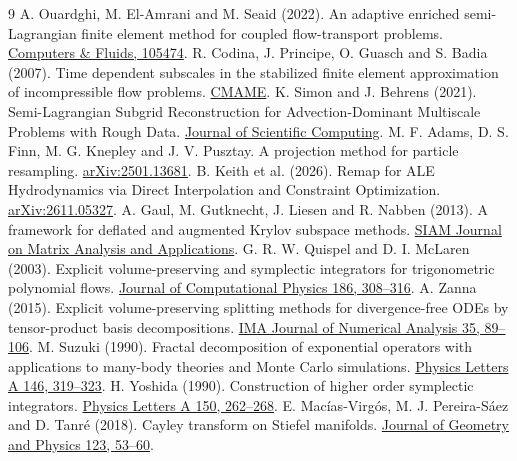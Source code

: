 \documentclass[10pt,a4paper]{article}
\begin{document}
\begin{thebibliography}{9}
 A. Ouardghi, M. El-Amrani and M. Seaid (2022).
An adaptive enriched semi-Lagrangian finite element method for coupled flow-transport problems.
\href{https://doi.org/10.1016/j.compfluid.2022.105474}{Computers \& Fluids, 105474}.
 R. Codina, J. Principe, O. Guasch and S. Badia (2007).
Time dependent subscales in the stabilized finite element approximation of incompressible
flow problems. \href{https://doi.org/10.1016/j.cma.2007.01.002}{CMAME}.
 K. Simon and J. Behrens (2021).
Semi-Lagrangian Subgrid Reconstruction for Advection-Dominant Multiscale Problems with Rough Data.
\href{https://doi.org/10.1007/s10915-021-01451-w}{Journal of Scientific Computing}.
 M. F. Adams, D. S. Finn, M. G. Knepley and J. V. Pusztay.
A projection method for particle resampling.
\href{https://arxiv.org/abs/2501.13681}{arXiv:2501.13681}.
 B. Keith et al. (2026).
Remap for ALE Hydrodynamics via Direct Interpolation and Constraint Optimization.
\href{https://arxiv.org/abs/2611.05327}{arXiv:2611.05327}.
 A. Gaul, M. Gutknecht, J. Liesen and R. Nabben (2013).
A framework for deflated and augmented Krylov subspace methods.
\href{https://people.math.ethz.ch/~mhg/pub/defl-GGLN1-SIMAX.pdf}{SIAM Journal on Matrix Analysis and Applications}.
 G. R. W. Quispel and D. I. McLaren (2003).
Explicit volume-preserving and symplectic integrators for trigonometric
polynomial flows. \href{https://www.sciencedirect.com/science/article/abs/pii/S0021999103000688}{Journal of Computational Physics 186, 308--316}.
 A. Zanna (2015). Explicit volume-preserving splitting
methods for divergence-free ODEs by tensor-product basis decompositions.
\href{https://doi.org/10.1093/imanum/drt070}{IMA Journal of Numerical Analysis 35, 89--106}.
 M. Suzuki (1990). Fractal decomposition of exponential
operators with applications to many-body theories and Monte Carlo simulations.
\href{https://doi.org/10.1016/0375-9601(90)90962-N}{Physics Letters A 146, 319--323}.
 H. Yoshida (1990). Construction of higher order symplectic
integrators. \href{https://doi.org/10.1016/0375-9601(90)90092-3}{Physics Letters A 150, 262--268}.
 E. Mac\'ias-Virg\'os, M. J. Pereira-S\'aez and D. Tanr\'e (2018).
Cayley transform on Stiefel manifolds.
\href{https://doi.org/10.1016/j.geomphys.2017.08.011}{Journal of Geometry and Physics 123, 53--60}.
\end{thebibliography}
\end{document}
